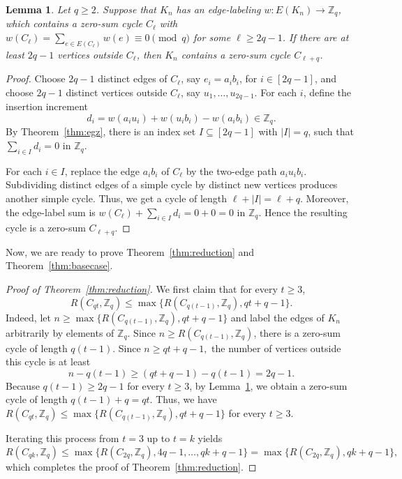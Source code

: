 \documentclass[11pt]{article}
\newtheorem{lemma}[theorem]{Lemma}
\theoremstyle{remark}
\newcommand{\Z}{\mathbb Z}
\begin{document}
\begin{lemma}\label{lem:insert}
    Let $q\ge 2$.  Suppose that $K_n$ has an edge-labeling
    \(w\colon E(K_n)\to \Z_q\),
    which contains a zero-sum cycle $C_\ell$ with $w(C_\ell)=\sum_{e\in E(C_\ell)}w(e)\equiv 0\pmod q$ for some  $\ell\ge 2q-1$.
    If there are at least $2q-1$ vertices outside $C_\ell$, then $K_n$ contains a zero-sum cycle $C_{\ell+q}$.
\end{lemma}

\begin{proof}
    Choose $2q-1$ distinct edges of $C_\ell$, say
    $e_i=a_i b_i$, for $i\in[2q-1]$,
    and choose $2q-1$ distinct vertices outside $C_\ell$, say $u_1,\dots,u_{2q-1}$.
    For each $i$, define the insertion increment
    \[
        d_i=w(a_i u_i)+w(u_i b_i)-w(a_i b_i)\in \Z_q.
    \]
    By Theorem~\ref{thm:egz}, there is an index set
    $I\subseteq [2q-1]$ with $|I|=q$,
    such that $\sum_{i\in I}d_i=0$ in $\Z_q$.

    For each $i\in I$, replace the edge $a_i b_i$ of $C_\ell$ by the two-edge path $a_iu_ib_i$.
    Subdividing distinct edges of a simple cycle by distinct new vertices produces another simple cycle.  Thus, we get a cycle of length $\ell+|I|=\ell+q$.
    Moreover, the edge-label sum is $w(C_\ell)+\sum_{i\in I}d_i=0+0=0$ in $\Z_q$.
    Hence the resulting cycle is a zero-sum $C_{\ell+q}$.
\end{proof}

Now, we are ready to prove Theorem~\ref{thm:reduction} and Theorem~\ref{thm:basecase}.

\begin{proof}[Proof of Theorem~\ref{thm:reduction}]
    We first claim that for every $t\ge 3$,
    \[
        R(C_{qt},\Z_q)\le \max\{R(C_{q(t-1)},\Z_q),qt+q-1\}.
    \]
    Indeed, let $n\ge \max\{R(C_{q(t-1)},\Z_q),qt+q-1\}$
    and label the edges of $K_n$ arbitrarily by elements of $\Z_q$.
    Since $n\ge R(C_{q(t-1)},\Z_q)$, there is a zero-sum cycle of length $q(t-1)$.
    Since $n\ge qt+q-1,$
    the number of vertices outside this cycle is at least
    \[
        n-q(t-1)
        \ge (qt+q-1)-q(t-1)
        =2q-1.
    \]
    Because $q(t-1)\ge 2q-1$ for every $t\ge 3$, by Lemma~\ref{lem:insert}, we obtain a zero-sum cycle of length $q(t-1)+q=qt$.
    Thus, we have $R(C_{qt},\Z_q)\le \max\{R(C_{q(t-1)},\Z_q),qt+q-1\}$ for every $t\ge 3$.

    Iterating this process from $t=3$ up to $t=k$ yields
    \[
        R(C_{qk},\Z_q)\le \max\{R(C_{2q},\Z_q),4q-1,\dots,qk+q-1\}
        =\max\{R(C_{2q},\Z_q),qk+q-1\},
    \]
    which completes the proof of Theorem~\ref{thm:reduction}.
\end{proof}
\end{document}
